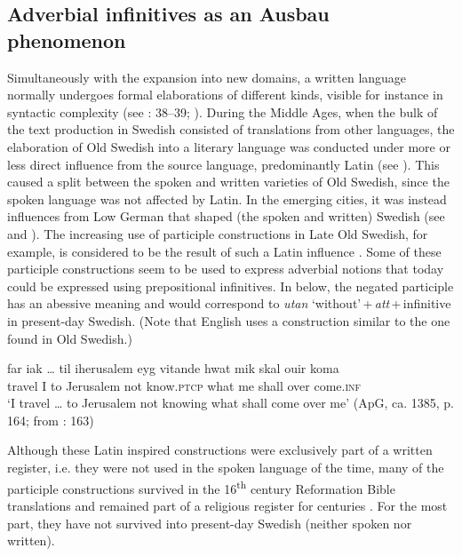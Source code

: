 \documentclass[output=paper]{langscibook}
\begin{document}
\subsection{Adverbial infinitives as an Ausbau phenomenon}\label{sec:kalm:5.2}


Simultaneously with the expansion into new domains, a written language normally undergoes formal elaborations of different kinds, visible for instance in syntactic complexity (see \citealt{Fischer2007}: 38–39; \citealt{Kloss1967}). During the Middle Ages, when the bulk of the text production in Swedish consisted of translations from other languages, the elaboration of Old Swedish into a literary language was conducted under more or less direct influence from the source language, predominantly Latin (see \citealt{Wollin1981,Wollin1983,Hoder2009, Hoder2010}). This caused a split between the spoken and written varieties of Old Swedish, since the spoken language was not affected by Latin. In the emerging cities, it was instead influences from Low German that shaped (the spoken and written) Swedish (see  and ). The increasing use of participle constructions in Late Old Swedish, for example, is considered to be the result of such a Latin influence \citep{Ahlberg1942,Hoder2010}. Some of these participle constructions seem to be used to express adverbial notions that today could be expressed using prepositional infinitives. In  below, the negated participle has an abessive meaning and would correspond to \textit{utan} ‘without’\,+\,\textit{att}\,+\,infinitive in present-day Swedish. (Note that English uses a construction similar to the one found in Old Swedish.)


\ea 
\label{ex:kalm:33}
 \gll far {iak …} til iherusalem eyg vitande hwat mik skal ouir koma\\ 
travel I to Jerusalem not know.\textsc{ptcp} what me shall over come.\textsc{inf}\\
 \glt ‘I travel … to Jerusalem not knowing what shall come over me’ (ApG, ca. 1385, p. 164; from \citealt{Ahlberg1942}: 163)
\z


Although these Latin inspired constructions were exclusively part of a written register, i.e. they were not used in the spoken language of the time, many of the participle constructions survived in the 16\textsuperscript{th} century Reformation Bible translations and remained part of a religious register for centuries \citep[17–19]{Stahle1970}. For the most part, they have not survived into present-day Swedish (neither spoken nor written). 
\end{document}
